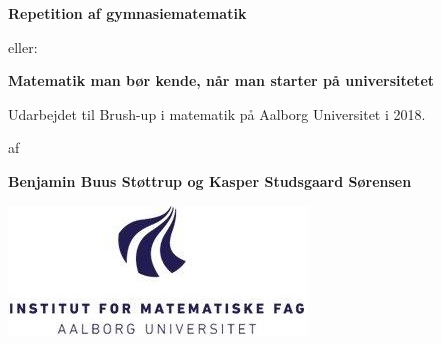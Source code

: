 



\author{Kasper Studsgaard Sørensen, Benjamin Buus Støttrup}

\pagestyle{plain}
\begin{titlepage}
    \begin{center}
        \vspace*{1cm}
        \Huge
        \textbf{Repetition af gymnasiematematik}
 
        \vspace{0.5cm}
        \Large
         eller:
         \vspace{0.5cm}

        
        \Huge
        \textbf{Matematik man bør kende, når man starter på universitetet}
        
        \vspace{0.5cm}
        \large
        Udarbejdet til Brush-up i matematik på Aalborg Universitet i 2018.
        \vspace{1.5cm}

        af 

        \vspace{1.5cm}
        \textbf{Benjamin Buus Støttrup og Kasper Studsgaard Sørensen}

        \vspace{3cm}

        \includegraphics[scale=1]{AAU_MATH.jpg}

        \vfill
        
 
      
        
        
    \end{center}
    \doclicenseThis
 \end{titlepage}



\tableofcontents

